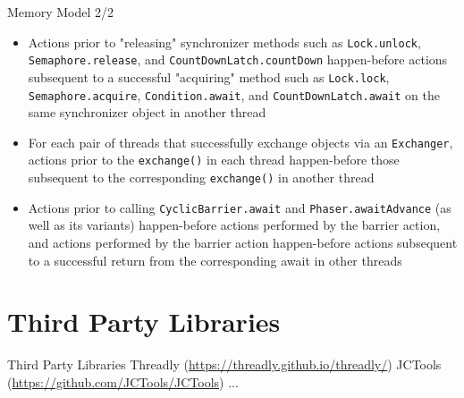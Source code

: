 \documentclass[
14pt,
aspectratio=169,
usenames,
dvipsnames,
x11names]{beamer}
\begin{document}
\begin{frame}{Memory Model 2/2}
  \small
  \begin{itemize}
  \item Actions prior to "releasing" synchronizer methods such as
    \texttt{Lock.unlock}, \texttt{Semaphore.release}, and
    \texttt{CountDownLatch.countDown} \alert{happen-before} actions
    subsequent to a successful "acquiring" method such as
    \texttt{Lock.lock}, \texttt{Semaphore.acquire},
    \texttt{Condition.await}, and \texttt{CountDownLatch.await} on the
    same synchronizer object in another thread

  \item For each pair of threads that successfully exchange objects via
    an \texttt{Exchanger}, actions prior to the \texttt{exchange()} in
    each thread \alert{happen-before} those subsequent to the
    corresponding \texttt{exchange()} in another thread

  \item Actions prior to calling \texttt{CyclicBarrier.await} and
    \texttt{Phaser.awaitAdvance} (as well as its variants)
    \alert{happen-before} actions performed by the barrier action, and
    actions performed by the barrier action \alert{happen-before}
    actions subsequent to a successful return from the corresponding
    await in other threads
  \end{itemize}
\end{frame}

\section{Third Party Libraries}

\begin{frame}{Third Party Libraries}
  Threadly (\url{https://threadly.github.io/threadly/})
  \vfill
  JCTools (\url{https://github.com/JCTools/JCTools})
  \vfill
  ...
\end{frame}


\end{document}
